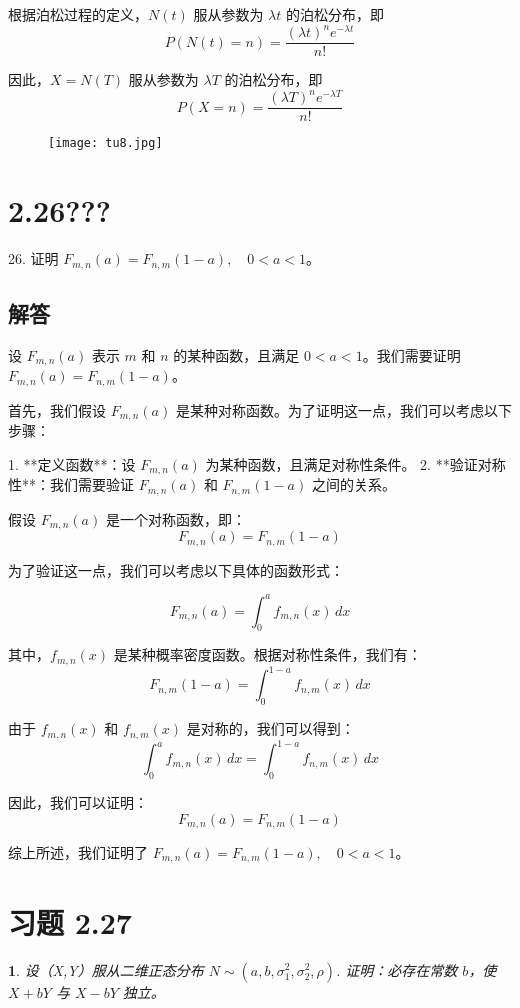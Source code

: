 \documentclass[UTF8]{report}
\theoremstyle{MyLineTheoremStyle} %
\theoremstyle{MyBlockTheoremStyle} %
\theoremstyle{MySubsubsectionStyle} %
\newtheorem{definition}{}
\begin{document}
根据泊松过程的定义，\(N(t)\) 服从参数为 \(\lambda t\) 的泊松分布，即
\[
P(N(t) = n) = \frac{(\lambda t)^n e^{-\lambda t}}{n!}
\]

因此，\(X = N(T)\) 服从参数为 \(\lambda T\) 的泊松分布，即
\[
P(X = n) = \frac{(\lambda T)^n e^{-\lambda T}}{n!}
\]

\begin{figure}[H]
    \centering
    \texttt{[image: tu8.jpg]}
\end{figure}


\section{2.26???}

26. 证明 \(F_{m,n}(a) = F_{n,m}(1-a), \quad 0 < a < 1\)。

\subsection*{解答}

设 \(F_{m,n}(a)\) 表示 \(m\) 和 \(n\) 的某种函数，且满足 \(0 < a < 1\)。我们需要证明 \(F_{m,n}(a) = F_{n,m}(1-a)\)。

首先，我们假设 \(F_{m,n}(a)\) 是某种对称函数。为了证明这一点，我们可以考虑以下步骤：

1. **定义函数**：设 \(F_{m,n}(a)\) 为某种函数，且满足对称性条件。
2. **验证对称性**：我们需要验证 \(F_{m,n}(a)\) 和 \(F_{n,m}(1-a)\) 之间的关系。

假设 \(F_{m,n}(a)\) 是一个对称函数，即：
\[
F_{m,n}(a) = F_{n,m}(1-a)
\]

为了验证这一点，我们可以考虑以下具体的函数形式：

\[
F_{m,n}(a) = \int_{0}^{a} f_{m,n}(x) \, dx
\]

其中，\(f_{m,n}(x)\) 是某种概率密度函数。根据对称性条件，我们有：
\[
F_{n,m}(1-a) = \int_{0}^{1-a} f_{n,m}(x) \, dx
\]

由于 \(f_{m,n}(x)\) 和 \(f_{n,m}(x)\) 是对称的，我们可以得到：
\[
\int_{0}^{a} f_{m,n}(x) \, dx = \int_{0}^{1-a} f_{n,m}(x) \, dx
\]

因此，我们可以证明：
\[
F_{m,n}(a) = F_{n,m}(1-a)
\]

综上所述，我们证明了 \(F_{m,n}(a) = F_{n,m}(1-a), \quad 0 < a < 1\)。



\section{习题 2.27}
\begin{definition}
    设（X,Y）服从二维正态分布 $N \sim (a,b,\sigma_1^2,\sigma_2^2,\rho)$.
    证明：必存在常数 $b$，使 $X + bY$ 与 $X - bY$ 独立。
\end{definition}
\end{document}
